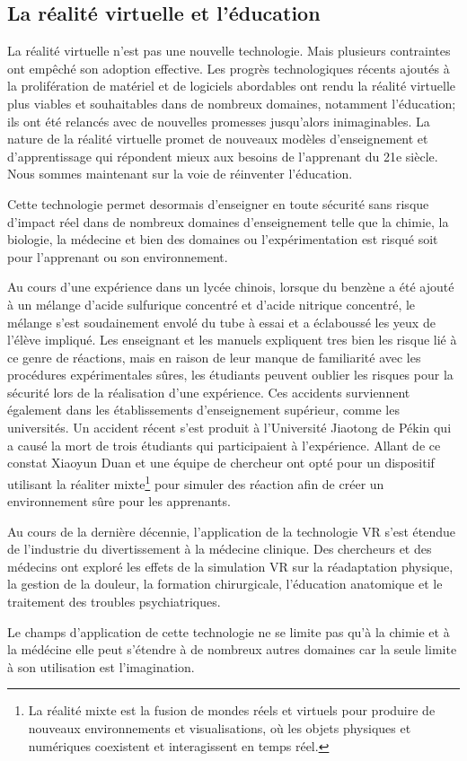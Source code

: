 \subsection{La réalité virtuelle et l'éducation}

La réalité virtuelle n'est pas une nouvelle technologie. Mais plusieurs contraintes ont empêché son adoption effective. Les progrès technologiques récents ajoutés à la prolifération de matériel et de logiciels abordables ont rendu la réalité virtuelle plus viables et souhaitables dans de nombreux domaines, notamment l'éducation; ils ont été relancés avec de nouvelles promesses jusqu'alors inimaginables. La nature de la réalité virtuelle promet de nouveaux modèles d'enseignement et d'apprentissage qui répondent mieux aux besoins de l'apprenant du 21e siècle. 
Nous sommes maintenant sur la voie de réinventer l'éducation.

Cette technologie permet desormais d'enseigner en toute sécurité sans risque d'impact réel dans de nombreux domaines d'enseignement telle que la chimie, la biologie, la médecine et bien des domaines ou l'expérimentation est risqué soit pour l'apprenant ou son environnement.

Au cours d'une expérience dans un lycée chinois, lorsque du benzène a été ajouté à un mélange d'acide sulfurique concentré et d'acide nitrique concentré, le mélange s'est soudainement envolé du tube à essai et a éclaboussé les yeux de l'élève impliqué\cite{duan2020mixed}. 
Les enseignant et les manuels expliquent tres bien les risque lié à ce genre de réactions, mais en raison de leur manque de familiarité avec les procédures expérimentales sûres, les étudiants peuvent oublier les risques pour la sécurité lors de la réalisation d'une expérience\cite{duan2020mixed}.
Ces accidents surviennent également dans les établissements d'enseignement supérieur, comme les universités. Un accident récent s'est produit à l'Université Jiaotong de Pékin qui a causé la mort de trois étudiants qui participaient à l'expérience.
Allant de ce constat Xiaoyun Duan\cite{duan2020mixed} et une équipe de chercheur ont opté pour un dispositif utilisant la réaliter mixte\footnote{La réalité mixte est la fusion de mondes réels et virtuels pour produire de nouveaux environnements et visualisations, où les objets physiques et numériques coexistent et interagissent en temps réel.} pour simuler des réaction afin de créer un environnement sûre pour les apprenants. 

Au cours de la dernière décennie, l'application de la technologie VR s'est étendue de l'industrie du divertissement à la médecine clinique. Des chercheurs et des médecins ont exploré les effets de la simulation VR sur la réadaptation physique, la gestion de la douleur, la formation chirurgicale, l'éducation anatomique et le traitement des troubles psychiatriques\cite{li2011virtual, baldominos2015approach, malloy2010effectiveness, alaker2016virtual, yiannakopoulou2015virtual, hackett2016three}.

Le champs d'application de cette technologie ne se limite pas qu'à la chimie et à la médécine elle peut s'étendre à de nombreux autres domaines car la seule limite à son utilisation est l'imagination.